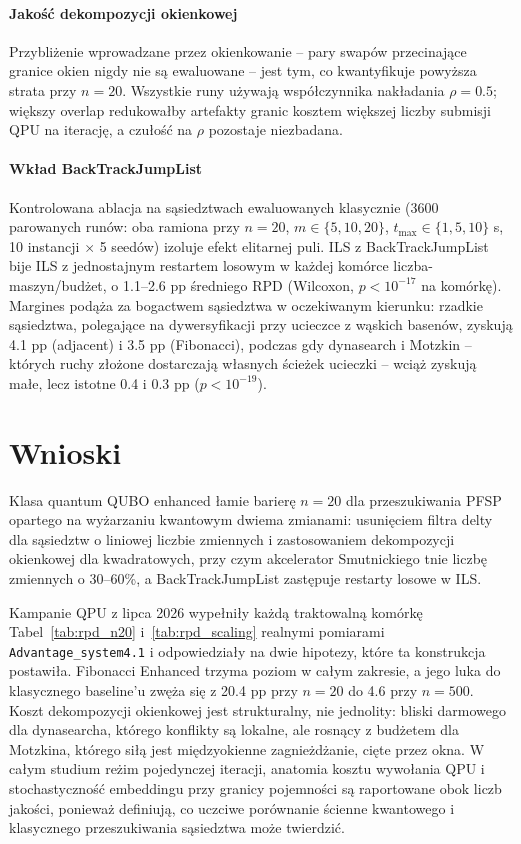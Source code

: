 \documentclass[11pt,a4paper]{article}
\begin{document}
\paragraph{Jakość dekompozycji okienkowej}
Przybliżenie wprowadzane przez okienkowanie -- pary swapów
przecinające granice okien nigdy nie są ewaluowane -- jest tym, co
kwantyfikuje powyższa strata przy $n=20$. Wszystkie runy używają
współczynnika nakładania $\rho=0.5$; większy overlap redukowałby
artefakty granic kosztem większej liczby submisji QPU na iterację,
a czułość na $\rho$ pozostaje niezbadana.

\paragraph{Wkład BackTrackJumpList}
Kontrolowana ablacja na sąsiedztwach ewaluowanych klasycznie (3600 parowanych
runów: oba ramiona przy $n=20$, $m\in\{5,10,20\}$,
$t_{\max}\in\{1,5,10\}$ s, 10 instancji $\times$ 5 seedów) izoluje
efekt elitarnej puli. ILS z BackTrackJumpList
bije ILS z jednostajnym restartem losowym w każdej komórce
liczba-maszyn/budżet, o 1.1--2.6 pp średniego RPD (Wilcoxon,
$p<10^{-17}$ na komórkę). Margines podąża za bogactwem sąsiedztwa
w oczekiwanym kierunku: rzadkie sąsiedztwa, polegające na
dywersyfikacji przy ucieczce z wąskich basenów, zyskują 4.1 pp
(adjacent) i 3.5 pp (Fibonacci), podczas gdy dynasearch i Motzkin --
których ruchy złożone dostarczają własnych ścieżek ucieczki -- wciąż
zyskują małe, lecz istotne 0.4 i 0.3 pp ($p<10^{-19}$).

\section{Wnioski}

Klasa quantum QUBO enhanced łamie barierę $n=20$ dla przeszukiwania
PFSP opartego na wyżarzaniu kwantowym dwiema zmianami: usunięciem
filtra delty dla sąsiedztw o liniowej liczbie zmiennych
i zastosowaniem dekompozycji okienkowej dla kwadratowych, przy czym
akcelerator Smutnickiego tnie liczbę zmiennych o 30--60\%,
a BackTrackJumpList zastępuje restarty losowe w ILS.

Kampanie QPU z lipca 2026 wypełniły każdą traktowalną komórkę
Tabel~\ref{tab:rpd_n20} i~\ref{tab:rpd_scaling} realnymi pomiarami
\texttt{Advantage\_system4.1} i odpowiedziały na dwie hipotezy, które
ta konstrukcja postawiła. Fibonacci Enhanced trzyma poziom w całym
zakresie, a jego luka do klasycznego baseline'u zwęża się z 20.4 pp
przy $n=20$ do 4.6 przy $n=500$. Koszt dekompozycji okienkowej jest
strukturalny, nie jednolity: bliski darmowego dla dynasearcha, którego
konflikty są lokalne, ale rosnący z budżetem dla Motzkina, którego
siłą jest międzyokienne zagnieżdżanie, cięte przez okna. W całym
studium reżim pojedynczej iteracji, anatomia kosztu wywołania QPU
i stochastyczność embeddingu przy granicy pojemności są raportowane
obok liczb jakości, ponieważ definiują, co uczciwe porównanie ścienne
kwantowego i klasycznego przeszukiwania sąsiedztwa może twierdzić.
\end{document}
